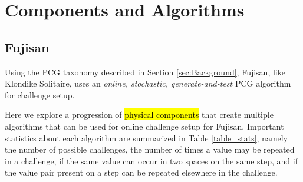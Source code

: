 \documentclass[journal]{IEEEtran}
\begin{document}
\section{Components and Algorithms} \label{section:pcgalgs}

\subsection{Fujisan}

\noindent
Using the PCG taxonomy described in Section \ref{sec:Background}, Fujisan, like Klondike Solitaire, uses an {\it online, stochastic, generate-and-test} PCG algorithm for challenge setup. 

Here we explore a progression of \hl{physical components} that create multiple algorithms that can be used for online challenge setup for Fujisan. Important statistics about each algorithm are summarized in Table \ref{table_stats}, namely the number of possible challenges, the number of times a value may be repeated in a challenge, if the same value can occur in two spaces on the same step, and if the value pair present on a step can be repeated elsewhere in the challenge.
\end{document}
